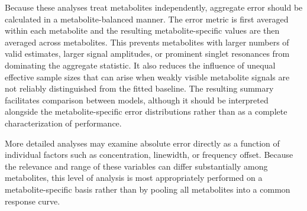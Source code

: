 Because these analyses treat metabolites independently, aggregate error should be calculated in a metabolite-balanced manner. The error metric is first averaged within each metabolite and the resulting metabolite-specific values are then averaged across metabolites. This prevents metabolites with larger numbers of valid estimates, larger signal amplitudes, or prominent singlet resonances from dominating the aggregate statistic. It also reduces the influence of unequal effective sample sizes that can arise when weakly visible metabolite signals are not reliably distinguished from the fitted baseline. The resulting summary facilitates comparison between models, although it should be interpreted alongside the metabolite-specific error distributions rather than as a complete characterization of performance.

More detailed analyses may examine absolute error directly as a function of individual factors such as concentration, linewidth, or frequency offset. Because the relevance and range of these variables can differ substantially among metabolites, this level of analysis is most appropriately performed on a metabolite-specific basis rather than by pooling all metabolites into a common response curve.

